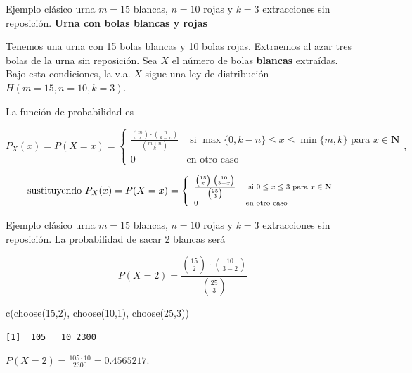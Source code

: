 \documentclass[
  ignorenonframetext,
  aspectratio=169]{beamer}
\newenvironment{Shaded}{\begin{snugshade}}{\end{snugshade}}
\newcommand{\DecValTok}[1]{\textcolor[rgb]{0.68,0.00,0.00}{#1}}
\newcommand{\FunctionTok}[1]{\textcolor[rgb]{0.28,0.35,0.67}{#1}}
\newcommand{\NormalTok}[1]{\textcolor[rgb]{0.00,0.23,0.31}{#1}}
\begin{document}
\begin{frame}{Ejemplo clásico urna \(m=15\) blancas, \(n=10\) rojas y
\(k=3\) extracciones sin reposición.}
\protect\hypertarget{ejemplo-cluxe1sico-urna-m15-blancas-n10-rojas-y-k3-extracciones-sin-reposiciuxf3n.}{}
\textbf{Urna con bolas blancas y rojas}

Tenemos una urna con 15 bolas blancas y 10 bolas rojas. Extraemos al
azar tres bolas de la urna sin reposición. Sea \(X\) el número de bolas
\textbf{blancas} extraídas. Bajo esta condiciones, la v.a. \(X\) sigue
una ley de distribución \(H(m=15,n=10,k=3)\).

La función de probabilidad es

\[
P_X(x)=P(X=x)=\left\{
\begin{array}{ll}
\frac{\binom{m}{x}\cdot \binom{n}{k-x}}{\binom{m+n}{k}} & \mbox{ si }
\max\{0,k-n\}\leq x \leq \min\{m,k\} \mbox { para  } x\in \mathbf{N}\\
0  & \mbox{en otro caso}\end{array}\right.,
\]

\[\mbox{sustituyendo }\scriptsize{
P_X(x)=P(X=x)=\left\{
\begin{array}{ll}
\frac{\binom{15}{x}\cdot \binom{10}{3-x}}{\binom{25}{3}} & \mbox{ si }
0\leq x \leq 3 \mbox { para  } x\in \mathbf{N}\\
0  & \mbox{en otro caso}\end{array}\right.
}\]
\end{frame}

\begin{frame}[fragile]{Ejemplo clásico urna \(m=15\) blancas, \(n=10\)
rojas y \(k=3\) extracciones sin reposición.}
\protect\hypertarget{ejemplo-cluxe1sico-urna-m15-blancas-n10-rojas-y-k3-extracciones-sin-reposiciuxf3n.-1}{}
La probabilidad de sacar 2 blancas será

\[
P(X=2)=\frac{\binom{15}{2}\cdot \binom{10}{3-2}}{\binom{25}{3}}
\]

\begin{Shaded}
\begin{Highlighting}[]
\FunctionTok{c}\NormalTok{(}\FunctionTok{choose}\NormalTok{(}\DecValTok{15}\NormalTok{,}\DecValTok{2}\NormalTok{), }\FunctionTok{choose}\NormalTok{(}\DecValTok{10}\NormalTok{,}\DecValTok{1}\NormalTok{), }\FunctionTok{choose}\NormalTok{(}\DecValTok{25}\NormalTok{,}\DecValTok{3}\NormalTok{))}
\end{Highlighting}
\end{Shaded}

\begin{verbatim}
[1]  105   10 2300
\end{verbatim}

\(P(X=2)=\frac{105\cdot10 }{2300}=0.4565217.\)
\end{frame}
\end{document}
